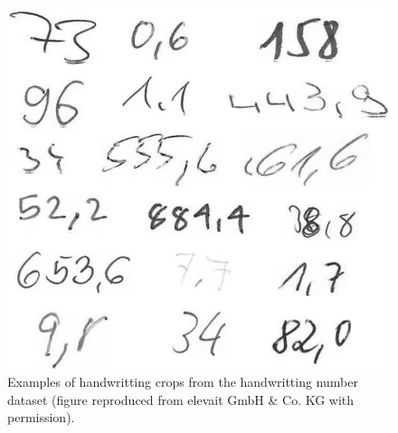 \begin{figure}[H]
        \begin{center}
    	  \includegraphics[scale=0.45]{images/Implementation/keinwifi.JPG}
	  \caption[Examples of handwritting crops from the handwritting number dataset.]{Examples of handwritting crops from the handwritting number dataset (figure reproduced from elevait GmbH \& Co. KG with permission).}
	  \label{fig:keinwifi}
	  \end{center}
\end{figure}


